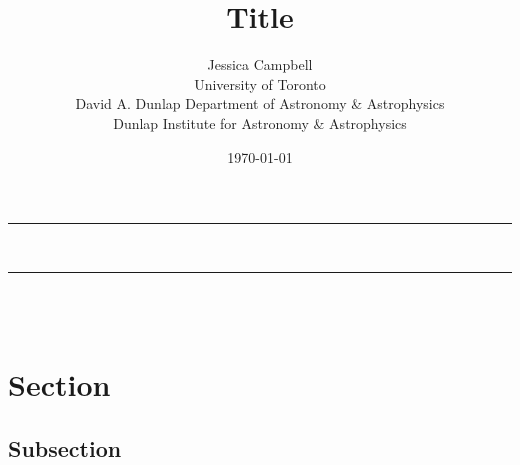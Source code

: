 \documentclass[a4paper,10pt]{article}
\makeatletter
\newcommand{\linia}{\rule{\linewidth}{0.5pt}}
\renewcommand{\maketitle}{
	\begin{center}
	\vspace*{5cm}
	\linia\\
	\vspace{0.25cm}
	{\huge \textsc{\@title}}
	\linia\\
	\vspace{2cm}
	\@date\\
	\vspace{5cm}
	\@author
	\end{center}
}
\makeatother
\begin{document}

\title{Title}
\author{Jessica Campbell\\University of Toronto\\David A. Dunlap Department of Astronomy \& Astrophysics\\Dunlap Institute for Astronomy \& Astrophysics}
\date{\today}
\maketitle

\newpage 


\section{Section}


\subsection{Subsection}













\end{document}
